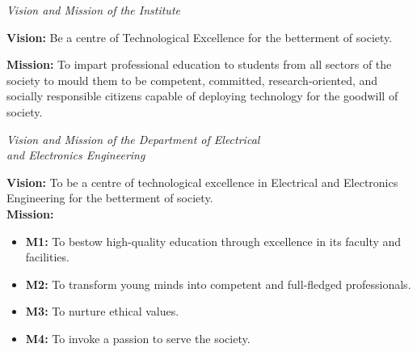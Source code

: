 \documentclass[12pt,a4paper]{report}
\begin{document}
\nocite{*}



\newpage
\begin{center}

   {\Large \textit{Vision and Mission of the Institute}} \\[1em]

\end{center}



\noindent\textbf{Vision:} Be a centre of Technological Excellence for the betterment of society.

\vspace{1em}

\noindent\textbf{Mission:} To impart professional education to students from all sectors of the society to
mould them to be competent, committed, research-oriented, and socially responsible citizens capable of deploying technology for the goodwill of society.

 

\begin{center}

   {\Large \textit{Vision and Mission of the Department of Electrical \\ and Electronics Engineering}} \\[1em]

\end{center}

 

\noindent\textbf{Vision:} To be a centre of technological excellence in Electrical and Electronics Engineering for the betterment of society.\\[0.5em]

 

\noindent\textbf{Mission:}

\begin{itemize}

 \item \textbf{M1:} To bestow high-quality education through excellence in its faculty and facilities.

 \item \textbf{M2:} To transform young minds into competent and full-fledged professionals.

 \item \textbf{M3:} To nurture ethical values.

 \item \textbf{M4:} To invoke a passion to serve the society.

\end{itemize}

 

 

 
\end{document}
